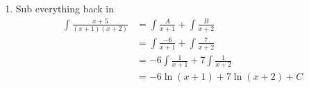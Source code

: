 \begin{simple}{}{}
\begin{enumerate}
	\item Sub everything back in
	\begin{align*}
	\int\frac{x+5}{(x+1)(x+2)}&=\int\frac{A}{x+1}+\int\frac{B}{x+2}\\
	&=\int\frac{-6}{x+1}+\int\frac{7}{x+2}\\
	&=-6\int\frac{1}{x+1}+7\int\frac{1}{x+2}\\
	&=-6\ln{(x+1)}+7\ln{(x+2)}+C
	\end{align*}
	\end{enumerate}
	\end{simple}